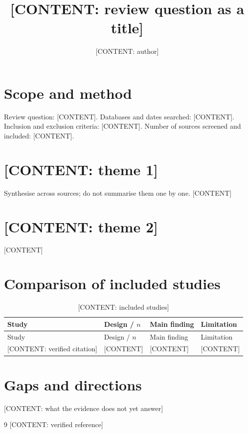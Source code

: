 \documentclass[11pt,a4paper]{article}
\title{\vspace{-2em}[CONTENT: review question as a title]}
\author{[CONTENT: author]}
\date{}
\begin{document}
\maketitle

\begin{abstract}
\end{abstract}

\section{Scope and method}
Review question: [CONTENT]. Databases and dates searched: [CONTENT]. Inclusion and exclusion
criteria: [CONTENT]. Number of sources screened and included: [CONTENT].

\section{[CONTENT: theme 1]}
Synthesise across sources; do not summarise them one by one. [CONTENT]

\section{[CONTENT: theme 2]}
{}[CONTENT]

\section{Comparison of included studies}
\begin{longtable}{@{}p{.22\linewidth}p{.16\linewidth}p{.26\linewidth}p{.26\linewidth}@{}}
\caption{[CONTENT: included studies]}\label{tab:studies}\\
\toprule
Study & Design / $n$ & Main finding & Limitation \\
\midrule
\endfirsthead
\toprule
Study & Design / $n$ & Main finding & Limitation \\
\midrule
\endhead
\bottomrule
\endfoot
{}[CONTENT: verified citation] & [CONTENT] & [CONTENT] & [CONTENT] \\
\end{longtable}

\section{Gaps and directions}
{}[CONTENT: what the evidence does not yet answer]

\begin{thebibliography}{9}
 [CONTENT: verified reference]
\end{thebibliography}
\end{document}
